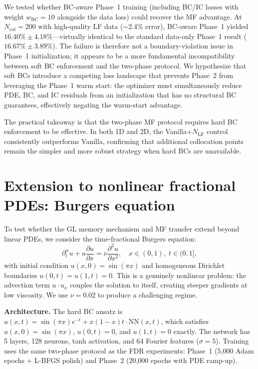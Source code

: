 \documentclass[11pt]{article}
\newcommand{\Ncol}{N_{\mathrm{col}}}
\newcommand{\NLF}{N_{\mathrm{LF}}}
\begin{document}
We tested whether BC-aware Phase~1 training (including BC/IC losses with weight $w_{\mathrm{BC}} = 10$ alongside the data loss) could recover the MF advantage. At $\Ncol = 200$ with high-quality LF data ($\sim$2.4\% error), BC-aware Phase~1 yielded $16.40\% \pm 4.18\%$---virtually identical to the standard data-only Phase~1 result ($16.67\% \pm 3.89\%$). The failure is therefore not a boundary-violation issue in Phase~1 initialization; it appears to be a more fundamental incompatibility between soft BC enforcement and the two-phase protocol. We hypothesize that soft BCs introduce a competing loss landscape that prevents Phase~2 from leveraging the Phase~1 warm start: the optimizer must simultaneously reduce PDE, BC, and IC residuals from an initialization that has no structural BC guarantees, effectively negating the warm-start advantage.

The practical takeaway is that the two-phase MF protocol requires hard BC enforcement to be effective. In both 1D and 2D, the Vanilla+$\NLF$ control consistently outperforms Vanilla, confirming that additional collocation points remain the simpler and more robust strategy when hard BCs are unavailable.

\section{Extension to nonlinear fractional PDEs: Burgers equation}
\label{sec:burgers}

To test whether the GL memory mechanism and MF transfer extend beyond linear PDEs, we consider the time-fractional Burgers equation:
\begin{equation}
\label{eq:burgers}
\partial_t^\alpha u + u \frac{\partial u}{\partial x} = \nu \frac{\partial^2 u}{\partial x^2}, \quad x \in (0, 1),\; t \in (0, 1],
\end{equation}
with initial condition $u(x, 0) = \sin(\pi x)$ and homogeneous Dirichlet boundaries $u(0, t) = u(1, t) = 0$. This is a genuinely nonlinear problem: the advection term $u \cdot u_x$ couples the solution to itself, creating steeper gradients at low viscosity. We use $\nu = 0.02$ to produce a challenging regime.

\textbf{Architecture.} The hard BC ansatz is $\hat{u}(x,t) = \sin(\pi x) e^{-t} + x(1-x) t \cdot \mathrm{NN}(x,t)$, which satisfies $u(x,0) = \sin(\pi x)$, $u(0,t) = 0$, and $u(1,t) = 0$ exactly. The network has 5 layers, 128 neurons, tanh activation, and 64 Fourier features ($\sigma = 5$). Training uses the same two-phase protocol as the FDR experiments: Phase~1 (5{,}000 Adam epochs + L-BFGS polish) and Phase~2 (20{,}000 epochs with PDE ramp-up).
\end{document}
